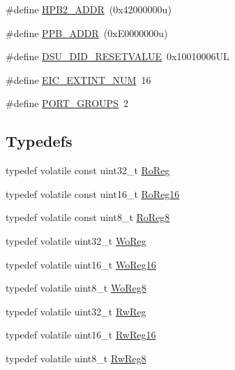\begin{DoxyCompactItemize}
\item 
\#define \mbox{\hyperlink{group___s_a_m_d21_g17_a__definitions_gaef42fa53ddf169a2a50be70d29f73571}{H\+P\+B2\+\_\+\+A\+D\+DR}}~(0x42000000u)
\item 
\#define \mbox{\hyperlink{group___s_a_m_d21_g17_a__definitions_ga8895d0a3a9a3126cc44330f86c8ce564}{P\+P\+B\+\_\+\+A\+D\+DR}}~(0x\+E0000000u)
\item 
\#define \mbox{\hyperlink{group___s_a_m_d21_g17_a__definitions_gada75131d542c9e1966238f5488f89bd6}{D\+S\+U\+\_\+\+D\+I\+D\+\_\+\+R\+E\+S\+E\+T\+V\+A\+L\+UE}}~0x10010006\+UL
\item 
\#define \mbox{\hyperlink{group___s_a_m_d21_g17_a__definitions_ga88ebc38c95506296f5d21f82476296ae}{E\+I\+C\+\_\+\+E\+X\+T\+I\+N\+T\+\_\+\+N\+UM}}~16
\item 
\#define \mbox{\hyperlink{group___s_a_m_d21_g17_a__definitions_gab9243ffe03a1dc631b57a495b4b3d467}{P\+O\+R\+T\+\_\+\+G\+R\+O\+U\+PS}}~2
\end{DoxyCompactItemize}
\subsection*{Typedefs}
\begin{DoxyCompactItemize}
\item 
typedef volatile const uint32\+\_\+t \mbox{\hyperlink{group___s_a_m_d21_g17_a__definitions_ga5d556f8391af4141be23f7334ac9dd68}{Ro\+Reg}}
\item 
typedef volatile const uint16\+\_\+t \mbox{\hyperlink{group___s_a_m_d21_g17_a__definitions_gaebf6e33c2d49a802e06e22a95ea9d0d0}{Ro\+Reg16}}
\item 
typedef volatile const uint8\+\_\+t \mbox{\hyperlink{group___s_a_m_d21_g17_a__definitions_ga0d957f1433aaf5d70e4dc2b68288442d}{Ro\+Reg8}}
\item 
typedef volatile uint32\+\_\+t \mbox{\hyperlink{group___s_a_m_d21_g17_a__definitions_gac0f96d4e8018367b38f527007cf0eafd}{Wo\+Reg}}
\item 
typedef volatile uint16\+\_\+t \mbox{\hyperlink{group___s_a_m_d21_g17_a__definitions_ga0ab0e5f6c8301aa1c2068e511d854094}{Wo\+Reg16}}
\item 
typedef volatile uint8\+\_\+t \mbox{\hyperlink{group___s_a_m_d21_g17_a__definitions_ga5e336e5a36ee12ebeafb021108e5275b}{Wo\+Reg8}}
\item 
typedef volatile uint32\+\_\+t \mbox{\hyperlink{group___s_a_m_d21_g17_a__definitions_gacf1496e3bbe303e55f627fc7558a68c7}{Rw\+Reg}}
\item 
typedef volatile uint16\+\_\+t \mbox{\hyperlink{group___s_a_m_d21_g17_a__definitions_gacce07556c80fc352ae607f225f19fed5}{Rw\+Reg16}}
\item 
typedef volatile uint8\+\_\+t \mbox{\hyperlink{group___s_a_m_d21_g17_a__definitions_gae361754be775bb192f85821d3ab33c17}{Rw\+Reg8}}
\end{DoxyCompactItemize}


